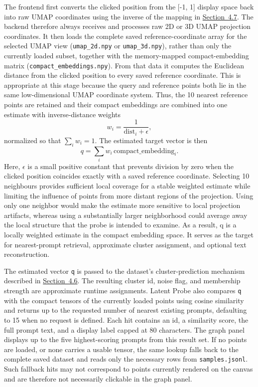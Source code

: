 The frontend first converts the clicked position from the [-1, 1] display space back into raw UMAP coordinates using the inverse of the mapping in \hyperref[sec:4.7]{Section~4.7}. The backend therefore always receives and processes raw 2D or 3D UMAP projection coordinates. It then loads the complete saved reference-coordinate array for the selected UMAP view (\texttt{umap\_2d.npy} or \texttt{umap\_3d.npy}), rather than only the currently loaded subset, together with the memory-mapped compact-embedding matrix (\texttt{compact\_embeddings.npy}). From that data it computes the Euclidean distance from the clicked position to every saved reference coordinate. This is appropriate at this stage because the query and reference points both lie in the same low-dimensional UMAP coordinate system. Thus, the 10 nearest reference points are retained and their compact embeddings are combined into one estimate with inverse-distance weights
\[
w_i = \frac{1}{\mathrm{dist}_i + \epsilon},
\]
normalized so that $\sum_i w_i = 1$. The estimated target vector is then
\[
q = \sum_i w_i \, \mathrm{compact\_embedding}_i.
\]
Here, $\epsilon$ is a small positive constant that prevents division by zero when the clicked position coincides exactly with a saved reference coordinate. Selecting 10 neighbours provides sufficient local coverage for a stable weighted estimate while limiting the influence of points from more distant regions of the projection. Using only one neighbor would make the estimate more sensitive to local projection artifacts, whereas using a substantially larger neighborhood could average away the local structure that the probe is intended to examine. As a result, q is a locally weighted estimate in the compact embedding space. It serves as the target for nearest-prompt retrieval, approximate cluster assignment, and optional text reconstruction.

The estimated vector \texttt{q} is passed to the dataset's cluster-prediction mechanism described in \hyperref[sec:4.6]{Section~4.6}. The resulting cluster id, noise flag, and membership strength are approximate runtime assignments. Latent Probe also compares \texttt{q} with the compact tensors of the currently loaded points using cosine similarity and returns up to the requested number of nearest existing prompts, defaulting to 15 when no request is defined. Each hit contains an id, a similarity score, the full prompt text, and a display label capped at 80 characters. The graph panel displays up to the five highest-scoring prompts from this result set. If no points are loaded, or none carries a usable tensor, the same lookup falls back to the complete saved dataset and reads only the necessary rows from \texttt{samples.jsonl}. Such fallback hits may not correspond to points currently rendered on the canvas and are therefore not necessarily clickable in the graph panel.


